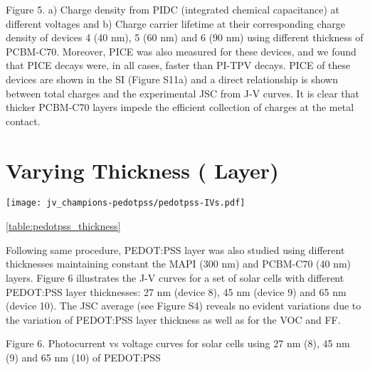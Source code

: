 Figure 5. a) Charge density from PIDC (integrated chemical capacitance) at different voltages and b) Charge carrier lifetime at their corresponding charge density of devices 4 (40 nm), 5 (60 nm) and 6 (90 nm) using different thickness of PCBM-C70.
Moreover, PICE was also measured for these devices, and we found that PICE decays were, in all cases, faster than PI-TPV decays. PICE of these devices are shown in the SI (Figure S11a) and a direct relationship is shown between total charges and the experimental JSC from J-V curves. It is clear that thicker PCBM-C70 layers impede the efficient collection of charges at the metal contact.





\section{Varying  Thickness ( Layer)}

\begin{SCfigure}
	\centering
	\texttt{[image: jv\_champions-pedotpss/pedotpss-IVs.pdf]}
	\label{fig:jv_champions-pedotpss}
\end{SCfigure}

\cref{table:pedotpss_thickness}




Following same procedure, PEDOT:PSS layer was also studied using different thicknesses maintaining constant the MAPI (300 nm) and PCBM-C70 (40 nm) layers.
Figure 6 illustrates the J-V curves for a set of solar cells with different PEDOT:PSS layer thicknesses: 27 nm (device 8), 45 nm (device 9) and 65 nm (device 10). The JSC average (see Figure S4) reveals no evident variations due to the variation of PEDOT:PSS layer thickness as well as for the VOC and FF.

Figure 6. Photocurrent vs voltage curves for solar cells using 27 nm (8), 45 nm (9) and 65 nm (10) of PEDOT:PSS 


